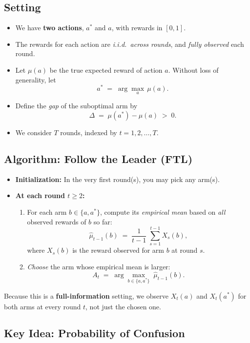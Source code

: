 \subsection*{Setting}

\begin{itemize}
\item We have \textbf{two actions}, $a^*$ and $a$, with rewards in $[0,1]$.
\item The rewards for each action are \emph{i.i.d.\ across rounds}, and \emph{fully observed} each round.
\item Let $\mu(a)$ be the true expected reward of action $a$.  Without loss of generality, let
\[
  a^* \;=\;\arg\max_{a} \,\mu(a).
\]
\item Define the \emph{gap} of the suboptimal arm by
\[
  \Delta
  \;=\;
  \mu(a^*) - \mu(a)
  \;>\;0.
\]
\item We consider $T$ rounds, indexed by $t=1,2,\dots,T$.
\end{itemize}

\subsection*{Algorithm:\; Follow the Leader (FTL)}

\begin{itemize}
\item \textbf{Initialization:} In the very first round(s), you may pick any arm(s).  
\item \textbf{At each round $t \ge 2$:}
  \begin{enumerate}
  \item For each arm $b \in \{a,a^*\}$, compute its \emph{empirical mean} based on \emph{all} observed rewards of $b$ so far:
  \[
    \hat{\mu}_{t-1}(b)
    \;=\;
    \frac{1}{t-1}\;\sum_{s=1}^{t-1} X_s(b),
  \]
  where $X_s(b)$ is the reward observed for arm $b$ at round $s$.
  \item \emph{Choose} the arm whose empirical mean is larger:
  \[
    A_t \;=\; \arg\max_{b \in \{a,a^*\}} \;\hat{\mu}_{t-1}(b).
  \]
  \end{enumerate}
\end{itemize}
Because this is a \textbf{full-information} setting, we observe $X_t(a)$ and $X_t(a^*)$ for both arms at every round $t$, not just the chosen one.

\subsection*{Key Idea:\; Probability of Confusion}

